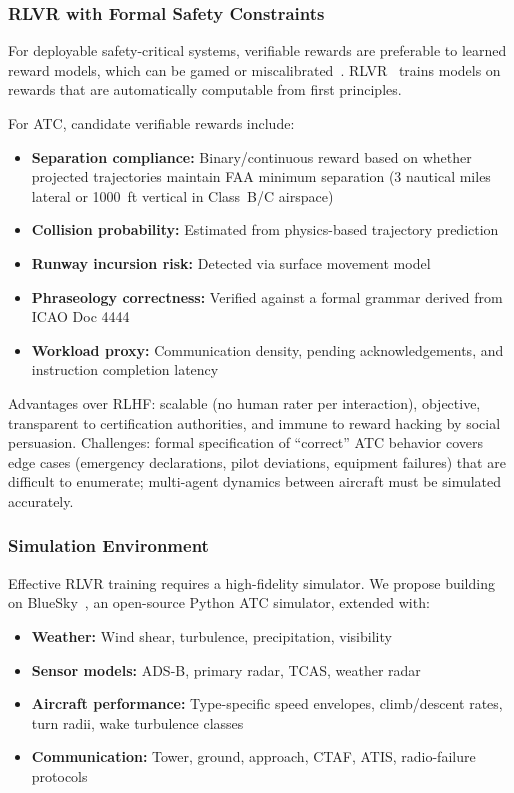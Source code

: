 \documentclass[11pt,a4paper]{article}
\begin{document}
\subsubsection{RLVR with Formal Safety Constraints}

For deployable safety-critical systems, verifiable rewards are preferable to
learned reward models, which can be gamed or miscalibrated~\cite{skalse2022reward}.
RLVR~\cite{lightman2023rlvr} trains models on rewards that are
automatically computable from first principles.

For ATC, candidate verifiable rewards include:
\begin{itemize}[noitemsep]
  \item \textbf{Separation compliance:} Binary/continuous reward based on
        whether projected trajectories maintain FAA minimum separation
        (3 nautical miles lateral or 1000~ft vertical in Class~B/C airspace)
  \item \textbf{Collision probability:} Estimated from physics-based
        trajectory prediction
  \item \textbf{Runway incursion risk:} Detected via surface movement model
  \item \textbf{Phraseology correctness:} Verified against a formal grammar
        derived from ICAO Doc 4444
  \item \textbf{Workload proxy:} Communication density, pending acknowledgements,
        and instruction completion latency
\end{itemize}

Advantages over RLHF: scalable (no human rater per interaction), objective,
transparent to certification authorities, and immune to reward hacking
by social persuasion.
Challenges: formal specification of ``correct'' ATC behavior covers edge cases
(emergency declarations, pilot deviations, equipment failures) that are
difficult to enumerate; multi-agent dynamics between aircraft must be simulated
accurately.

\subsubsection{Simulation Environment}

Effective RLVR training requires a high-fidelity simulator.
We propose building on BlueSky~\cite{hoekstra2016bluesky}, an open-source
Python ATC simulator, extended with:
\begin{itemize}[noitemsep]
  \item \textbf{Weather:} Wind shear, turbulence, precipitation, visibility
  \item \textbf{Sensor models:} ADS-B, primary radar, TCAS, weather radar
  \item \textbf{Aircraft performance:} Type-specific speed envelopes,
        climb/descent rates, turn radii, wake turbulence classes
  \item \textbf{Communication:} Tower, ground, approach, CTAF, ATIS,
        radio-failure protocols
\end{itemize}
\end{document}

